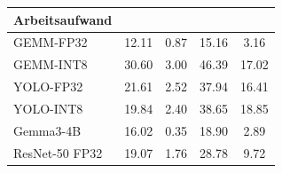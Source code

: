\begin{tabular}{@{}lS[table-format=2.2]S[table-format=1.2]S[table-format=2.2]S[table-format=2.2]@{}}
\toprule
Arbeitsaufwand & {} & {} & {} & {} \\
\midrule
GEMM-FP32 & 12.11 & 0.87 & 15.16 & 3.16 \\
GEMM-INT8 & 30.60 & 3.00 & 46.39 & 17.02 \\
YOLO-FP32 & 21.61 & 2.52 & 37.94 & 16.41 \\
YOLO-INT8 & 19.84 & 2.40 & 38.65 & 18.85 \\
Gemma3-4B & 16.02 & 0.35 & 18.90 & 2.89 \\
ResNet-50 FP32 & 19.07 & 1.76 & 28.78 & 9.72 \\
\bottomrule
\end{tabular}
